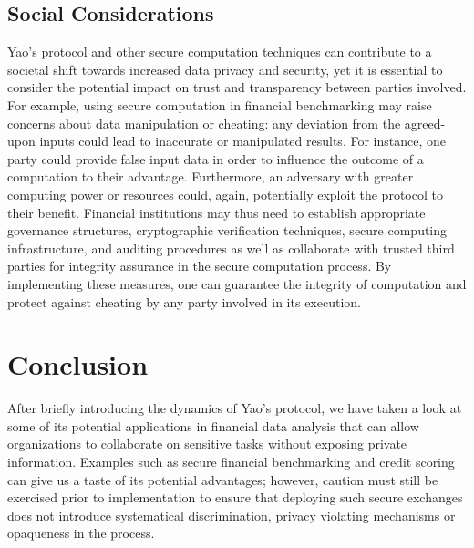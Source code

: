 \documentclass[12pt]{article}
\begin{document}
\subsection{Social Considerations}

Yao's protocol and other secure computation techniques can contribute to a societal shift towards increased data privacy and security, yet it is essential to consider the potential impact on trust and transparency between parties involved. For example, using secure computation in financial benchmarking may raise concerns about data manipulation or cheating: any deviation from the agreed-upon inputs could lead to inaccurate or manipulated results. For instance, one party could provide false input data in order to influence the outcome of a computation to their advantage. Furthermore, an adversary with greater computing power or resources could, again, potentially exploit the protocol to their benefit. Financial institutions may thus need to establish appropriate governance structures, cryptographic verification techniques, secure computing infrastructure, and auditing procedures as well as collaborate with trusted third parties for integrity assurance in the secure computation process. By implementing these measures, one can guarantee the integrity of computation and protect against cheating by any party involved in its execution.

\section{Conclusion}\label{sec:conclusions}

After briefly introducing the dynamics of Yao's protocol, we have taken a look at some of its potential applications in financial data analysis that can allow organizations to collaborate on sensitive tasks without exposing private information. Examples such as secure financial benchmarking and credit scoring can give us a taste of its potential advantages; however, caution must still be exercised prior to implementation to ensure that deploying such secure exchanges does not introduce systematical discrimination, privacy violating mechanisms or opaqueness in the process.



\end{document}
